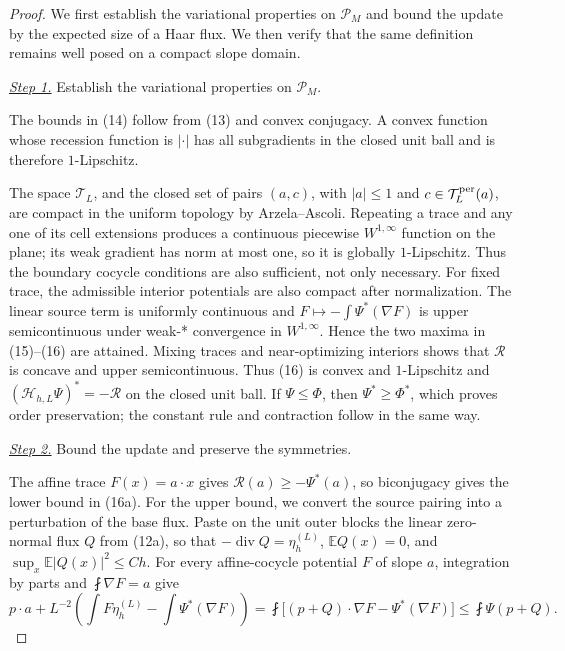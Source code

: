 \documentclass{smfart}
\theoremstyle{definition}
\newcommand{\1}{\mathbf 1}
\begin{document}
\begin{proof}
We first establish the variational properties on $\mathscr P_M$ and
bound the update by the expected size of a Haar flux.  We then verify
that the same definition remains well posed on a compact slope domain.

\smallskip\noindent
\underline{\textit{Step 1.}} Establish the variational properties on $\mathscr P_M$.

The bounds in (14) follow from (13) and convex conjugacy. A convex
function whose recession function is $|\cdot|$ has all subgradients in
the closed unit ball and is therefore $1$-Lipschitz.

The space $\mathcal T_ L$, and the closed set of pairs $(a,c)$, with
$|a|\leq1$ and $c\in\mathcal T_ L^{\rm per}(a)$, are compact in the
uniform topology by Arzela--Ascoli.  Repeating a trace and any one of its
cell extensions produces a continuous piecewise $W^{1,\infty}$ function
on the plane; its weak gradient has norm at most one, so it is globally
$1$-Lipschitz.  Thus the boundary cocycle conditions are also sufficient,
not only necessary.  For fixed trace, the admissible interior potentials are
also compact after normalization.  The linear source term is uniformly
continuous and $F\mapsto-\int\Psi^*(\nabla F)$ is upper
semicontinuous under weak-* convergence in $W^{1,\infty}$.  Hence the
two maxima in (15)--(16) are attained.  Mixing traces and
near-optimizing interiors shows that $\mathcal R$ is concave and upper
semicontinuous. Thus (16) is convex and $1$-Lipschitz and
$(\mathcal H_ {h,L}\Psi)^*=-\mathcal R$ on the closed unit ball.  If
$\Psi\leq\Phi$, then $\Psi^*\geq\Phi^*$, which proves order
preservation; the constant rule and contraction follow in the same way.

\smallskip\noindent
\underline{\textit{Step 2.}} Bound the update and preserve the symmetries.

The affine trace $F(x)=a\cdot x$ gives
$\mathcal R(a)\geq-\Psi^*(a)$, so biconjugacy gives the lower bound in
(16a).  For the upper bound, we convert the source pairing into a perturbation
of the base flux.  Paste on the unit outer blocks the linear zero-normal
flux $Q$ from (12a), so that
$-\operatorname {div}Q=\eta_ h^{(L)}$,
$\mathbb E Q(x)=0$, and
$\sup_ x\mathbb E|Q(x)|^2\leq Ch$.  For every affine-cocycle potential
$F$ of slope $a$, integration by parts and
$\fint\nabla F=a$ give
\begin{equation}
p\cdot a+L^{-2}\left(\int F\eta_ h^{(L)}-
\int\Psi^*(\nabla F)\right)
=\fint\bigl[(p+Q)\cdot\nabla F-\Psi^*(\nabla F)\bigr]
\leq\fint\Psi(p+Q).
\tag{16b}
\end{equation}


\end{proof}
\end{document}
